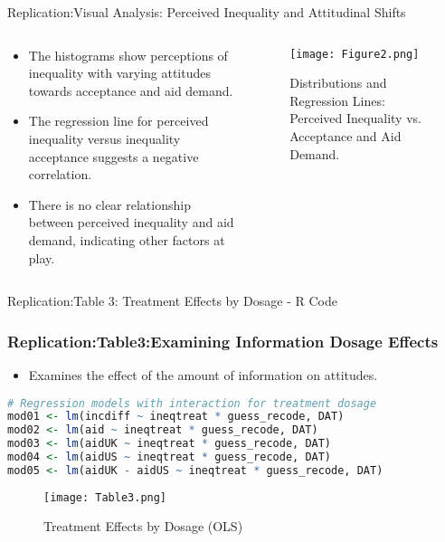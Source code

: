\documentclass[aspectratio=169,10pt,compress]{beamer}
\begin{document}
\begin{frame}{Replication:Visual Analysis: Perceived Inequality and Attitudinal Shifts}
  \begin{columns}[T] %
    \begin{column}{0.5\textwidth}
      \begin{itemize}
        \item The histograms show perceptions of inequality with varying attitudes towards acceptance and aid demand.
        \item The regression line for perceived inequality versus inequality acceptance suggests a negative correlation.
        \item There is no clear relationship between perceived inequality and aid demand, indicating other factors at play.
      \end{itemize}
    \end{column}
    \begin{column}{0.5\textwidth}
      \begin{figure}
        \centering
        \texttt{[image: Figure2.png]}
        \caption{Distributions and Regression Lines: Perceived Inequality vs. Acceptance and Aid Demand.}
      \end{figure}
    \end{column}
  \end{columns}
\end{frame}
\begin{frame}[fragile]{Replication:Table 3: Treatment Effects by Dosage - R Code}
  \frametitle{Replication:Table3:Examining Information Dosage Effects}
  
  \begin{itemize}
    \item Examines the effect of the amount of information on attitudes.
  \end{itemize}
  
  \begin{lstlisting}[language=R]
# Regression models with interaction for treatment dosage
mod01 <- lm(incdiff ~ ineqtreat * guess_recode, DAT)
mod02 <- lm(aid ~ ineqtreat * guess_recode, DAT)
mod03 <- lm(aidUK ~ ineqtreat * guess_recode, DAT)
mod04 <- lm(aidUS ~ ineqtreat * guess_recode, DAT)
mod05 <- lm(aidUK - aidUS ~ ineqtreat * guess_recode, DAT)
  \end{lstlisting}
  
  \begin{figure}
    \centering
    \texttt{[image: Table3.png]}
    \caption{Treatment Effects by Dosage (OLS)}
  \end{figure}
\end{frame}
\end{document}
